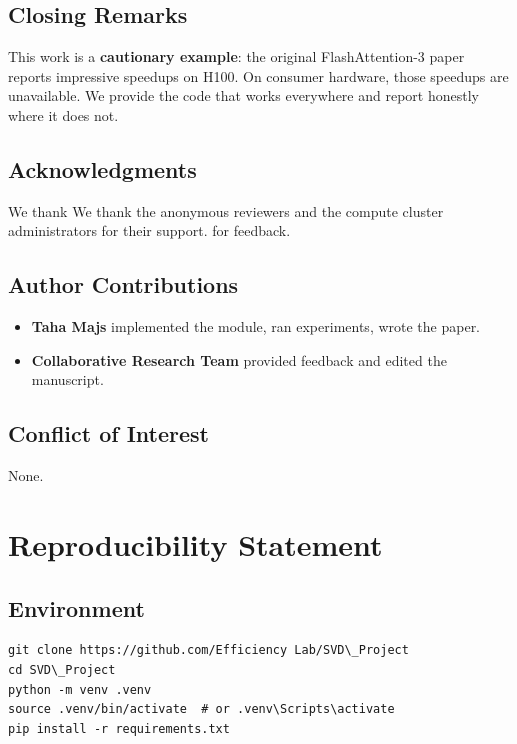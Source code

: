 \subsection{Closing Remarks}

This work is a \textbf{cautionary example}: the original FlashAttention-3 paper 
reports impressive speedups on H100. On consumer hardware, those speedups 
are unavailable. We provide the code that works everywhere and report 
honestly where it does not.

\subsection{Acknowledgments}

We thank We thank the anonymous reviewers and the compute cluster administrators for their support. for feedback.

\subsection{Author Contributions}

\begin{itemize}
\item \textbf{Taha Majs} implemented the module, ran experiments, wrote the paper.
\item \textbf{Collaborative Research Team} provided feedback and edited the manuscript.

\end{itemize}
\subsection{Conflict of Interest}

None.




\section{Reproducibility Statement}

\subsection{Environment}

\begin{lstlisting}
git clone https://github.com/Efficiency Lab/SVD\_Project
cd SVD\_Project
python -m venv .venv
source .venv/bin/activate  # or .venv\Scripts\activate
pip install -r requirements.txt
\end{lstlisting}

